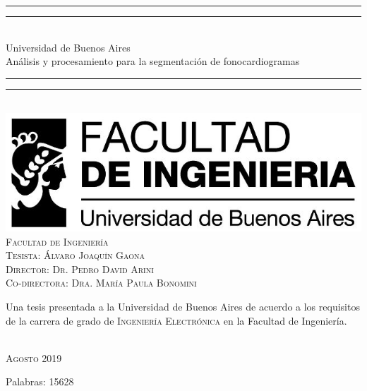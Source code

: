 \begin{titlepage}
  \vspace*{5mm}
  \begin{center}
  \rule[0.5ex]{\linewidth}{2pt}\vspace*{-\baselineskip}\vspace*{3.2pt}
  \rule[0.5ex]{\linewidth}{1pt}\\[\baselineskip]
  {\Huge Universidad de Buenos Aires }\\[4mm]
  {\Large Análisis y procesamiento para la segmentación de fonocardiogramas}\\
  \rule[0.5ex]{\linewidth}{1pt}\vspace*{-\baselineskip}\vspace{3.2pt}
  \rule[0.5ex]{\linewidth}{2pt}\\
  \vspace{6.5mm}
  \includegraphics[scale=0.4]{sections/logo-facu-caratula.jpg}\\
  \vspace{6mm}
  {\large %
  \textsc{Facultad de Ingeniería}}\\
  \vspace{6.5mm}
  {\large\textsc{Tesista: Álvaro Joaquín Gaona}}\\
  {\large\textsc{Director: Dr. Pedro David Arini}}\\
  {\large\textsc{Co-directora: Dra. María Paula Bonomini}}\\
  \vspace{11mm}
  \begin{minipage}{14.1cm}
  Una tesis presentada a la Universidad de Buenos Aires de acuerdo a los requisitos de la carrera de grado de \textsc{Ingeniería} \textsc{Electrónica} en la Facultad de Ingeniería.
  \end{minipage}\\
  \vspace{9mm}
  {\large\textsc{Agosto 2019}}
  \vspace{12mm}
  \end{center}
  \begin{flushright}
  {\small Palabras: 15628}
  \end{flushright}
\end{titlepage}